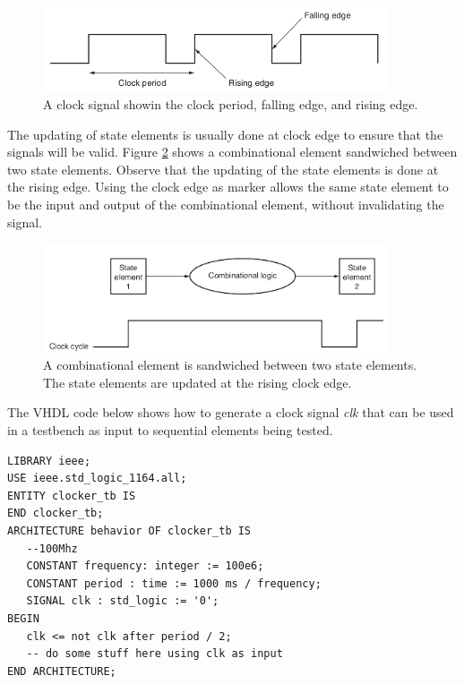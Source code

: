 \documentclass[a4paper, 11pt,oneside]{article}
\begin{document}
\begin{figure}[H]
	\begin{center}
	\includegraphics[width=4in]{clock0.png}
	\caption{A clock signal showin the clock period, falling edge, and rising edge.}
	\label{fig:clock0} 
	\end{center}
\end{figure}

The updating of state elements is usually done at clock edge to ensure that the 
signals will be valid. Figure \ref{fig:clock1} shows a combinational element 
sandwiched between two state elements. Observe that the updating of the state 
elements is done at the rising edge. Using the clock edge as marker allows the 
same state element to be the input and output of the combinational element, 
without invalidating the signal. 

\begin{figure}[H]
	\begin{center}
	\includegraphics[width=4in]{clock1.png}
	\caption{A combinational element is sandwiched between two state elements. 
	The state elements are updated at the rising clock edge.}
	\label{fig:clock1} 
	\end{center}
\end{figure}

The VHDL code below shows how to generate a clock signal \textit{clk} that can 
be used in a testbench as input to sequential elements being tested. 

\begin{verbatim}
LIBRARY ieee;
USE ieee.std_logic_1164.all;
ENTITY clocker_tb IS
END clocker_tb;
ARCHITECTURE behavior OF clocker_tb IS
   --100Mhz
   CONSTANT frequency: integer := 100e6; 
   CONSTANT period : time := 1000 ms / frequency;
   SIGNAL clk : std_logic := '0';
BEGIN 
   clk <= not clk after period / 2;
   -- do some stuff here using clk as input
END ARCHITECTURE;
\end{verbatim}
\end{document}
